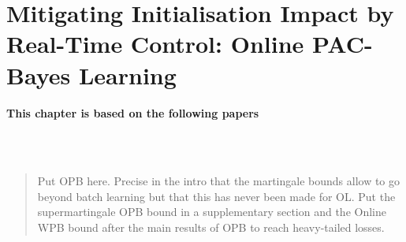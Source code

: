 \chapter[Mitigating Initialisation Impact by Real-Time Control: Online PAC-Bayes Learning]{Mitigating Initialisation Impact by Real-Time Control: Online PAC-Bayes Learning}
\label{chap:online-pb}

\addchapterlof
\addchapterloa
\addchapterloe

\vspace{-1.0cm}
\begin{center}
\textbf{This chapter is based on the following papers}\\[0.1cm]
\end{center}
\\
\\

\vspace{0.2cm}
\minitoc

\begin{abstract}
Put OPB here. Precise in the intro that the martingale bounds allow to go beyond batch learning but that this has never been made for OL. Put the supermartingale OPB bound in a supplementary section and the Online WPB bound after the main results of OPB to reach heavy-tailed losses. 
\end{abstract}

\newpage

